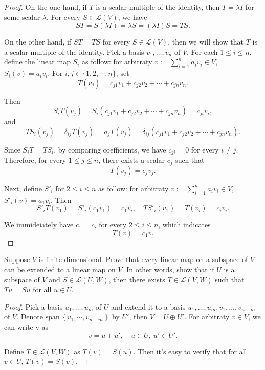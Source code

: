\documentclass{article}
\newcommand{\sspan}{\text{span}\,}
\begin{document}
\begin{proof}
    On the one hand, if \( T \) is a scalar multiple of the identity, then \( T = \lambda I \) for some scalar \( \lambda \). For every \( S \in \mathcal{L}(V) \), we have
    \[ ST = S(\lambda I) = \lambda S = (\lambda I)S = TS. \]\par
    On the other hand, if \( ST = TS \) for every \( S \in \mathcal{L}(V) \), then we will show that \( T \) is a scalar multiple of the identity. Pick a basis \( v_1, \ldots, v_n \) of \( V \). For each $ 1\le i\le n $, define the linear map $ S_i  $ as follow: for arbitraty $ v:=\sum_{i=1}^{n} a_iv_i\in V $, $ S_i(v)=a_iv_i $. For $ i,j\in\{1,2,\cdots,n\} $, set 
    \[ T(v_j)=c_{j1}v_1+c_{j2}v_2+\cdots+c_{jn}v_n. \] \par
    Then
    \[ S_iT(v_j)=S_i(c_{j1}v_1+c_{j2}v_2+\cdots+c_{jn}v_n)=c_{ji}v_i, \]
    and
    \[ TS_i(v_j)=\delta_{ij}T(v_j)=a_jT(v_j)=\delta_{ij}(c_{j1}v_1+c_{j2}v_2+\cdots+c_{jn}v_n). \]\par
    Since $ S_iT=TS_i $, by comparing coefficients, we have $ c_{ji}=0 $ for every $ i\neq j $. Therefore, for every $ 1\le j\le n $, there exists a scalar $ c_j $ such that
    \[ T(v_j)=c_jv_j. \]\par
    Next, define $ S'_{i} $ for $ 2\le i\le n $ as follow: for arbitraty $ v:=\sum_{i=1}^{n} a_iv_i\in V $, $ S'_{i}(v)=a_1v_i $. Then
    \[ S'_{i}T(v_1)=S'_{i}(c_1v_1)=c_1v_i,\quad TS'_{i}(v_1)=T(v_i)=c_iv_i. \]\par
    We immideiately have $ c_1=c_i $ for every $ 2\le i\le n $, which indicates
    \[ T(v)=c_1v. \] 
\end{proof}

\begin{problem}[3A-13]
    Suppose \( V \) is finite-dimensional. Prove that every linear map on a subspace of \( V \) can be extended to a linear map on \( V \). In other words, show that if \( U \) is a subspace of \( V \) and \( S \in \mathcal{L}(U, W) \), then there exists \( T \in \mathcal{L}(V, W) \) such that \( Tu = Su \) for all \( u \in U \).
\end{problem}

\begin{proof}
    Pick a basis \( u_1, \ldots, u_m \) of \( U \) and extend it to a basis \( u_1, \ldots, u_m, v_1, \ldots, v_{n-m} \) of \( V \). Denote \( \sspan \left\{v_1,\cdots,v_{n-m}\right\} \) by \( U' \), then \( V=U\oplus U' \). For arbitraty \( v\in V \), we can write v as
    \[ v=u+u',\quad u\in U,\ u'\in U'. \] \par
    Define \( T\in \mathcal{L}(V,W) \) as \( T(v)=S(u). \) Then it's easy to verify that for all \( v\in U \), \( T(v)=S(v) \).
\end{proof}
\end{document}
